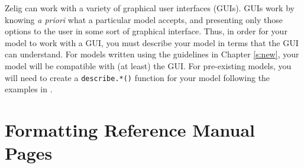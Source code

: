 Zelig can work with a variety of graphical user interfaces (GUIs).  GUIs
work by knowing {\it a priori} what a particular model
accepts, and presenting only those options to the user in some sort of
graphical interface.  Thus, in order for your model to work with a
GUI, you must describe your model in terms that the GUI can
understand.  For models written using the guidelines in Chapter
\ref{s:new}, your model will be compatible with (at least)
the  GUI.  For
pre-existing models, you will need to create a {\tt describe.*()}
function for your model following the examples in
.  

\section{Formatting Reference Manual Pages}  \label{s:format}

